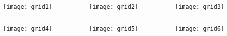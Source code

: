 \documentclass{beamer}
\begin{document}
\begin{frame}
  \begin{columns}[t]
    \begin{column}{0.3\textwidth}
      \begin{center}
        \texttt{[image: grid1]}
      \end{center}
    \end{column}
    \begin{column}{0.3\textwidth}
      \begin{center}
        \texttt{[image: grid2]}
      \end{center}
    \end{column}
    \begin{column}{0.3\textwidth}
      \begin{center}
        \texttt{[image: grid3]}
      \end{center}
    \end{column}
  \end{columns}
  \begin{columns}[t]
    \begin{column}{0.3\textwidth}
      \begin{center}
        \texttt{[image: grid4]}
      \end{center}
    \end{column}
    \begin{column}{0.3\textwidth}
      \begin{center}
        \texttt{[image: grid5]}
      \end{center}
    \end{column}
    \begin{column}{0.3\textwidth}
      \begin{center}
        \texttt{[image: grid6]}
      \end{center}
    \end{column}
  \end{columns}
  \begin{columns}[t]
    \begin{column}{0.3\textwidth}
      \begin{center}

\end{center}
\end{column}
\end{columns}
\end{frame}
\end{document}
